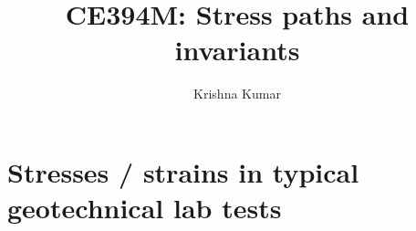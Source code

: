 \documentclass[notes]{beamer}
\title[CE394M: Stresses - paths \& invariants]{CE394M: Stress paths and invariants}
\author{Krishna Kumar} %
\institute[UT Austin] %
{
University of Texas at Austin \\
\medskip
\textit{
  \url{krishnak@utexas.edu}} %
}
\date{} %
\begin{document}
\begin{frame}
\titlepage %
\end{frame}


\section{Stresses / strains in typical geotechnical lab tests}
\end{document}
